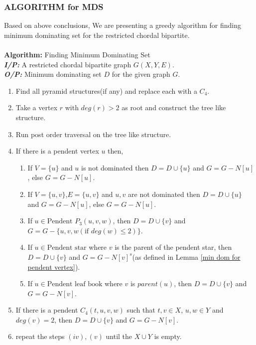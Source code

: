 \documentclass[11pt]{article}
\begin{document}
\subsubsection{ALGORITHM for MDS}
\begin{flushleft}
Based on above conclusions, We are presenting a greedy algorithm for finding minimum dominating set for the restricted chordal bipartite.\\
\hrulefill \\
\textbf{Algorithm:} Finding Minimum Dominating Set\\
\textbf{\textit{I/P:}} A restricted chordal bipartite graph $G(X,Y,E)$.\\
\textbf{\textit{O/P:}} Minimum dominating set $D$ for the given graph $G$.\\
\hrulefill

\begin{enumerate}[label=(\roman*)]
\item Find all pyramid structures(if any) and replace each with a $C_4$.
\item Take a vertex $r$ with $deg(r) > 2$ as root and construct the tree like structure.
\item Run post order traversal on the tree like structure.
\item If there is a pendent vertex $u$ then, 
\begin{enumerate}
	\item If $V= \{u\}$ and $u$ is not dominated then $D=D \cup \{ u \}$ and $G = G-N[u]$, else $G = G-N[u]$.
	\item If $V= \{u,v\}$,$E=\{u,v\}$ and $u,v$ are not dominated then $D=D \cup \{ u \}$ and $G = G-N[u]$, else $G = G-N[u]$.
	\item If $u \in \mbox{Pendent }P_3(u,v,w)$, then $D=D \cup \{ v \}$ and  $G = G - \{u,v,w(\mbox{if } deg(w) \leq 2) \}$.
	\item If $u \in \mbox{Pendent star}$ where $v$ is the parent of the pendent star, then $D=D \cup \{ v \}$ and $G = G -N[v]^s$(as defined in Lemma \ref{min dom for pendent vertex}).
	\item If $u \in \mbox{Pendent leaf book}$ where $v$ is $parent(u)$, then $D=D \cup \{ v \}$ and $G = G - N[v]$.
\end{enumerate}
\item If there is a pendent $C_4(t,u,v,w)$ such that $t,v \in X$, $u,w \in Y$ and $deg(v)=2$, then $D=D \cup \big \{ v \big \}$ and $G = G - N[v]$.
\item repeat the steps $(iv),(v)$ until the $X \cup Y$ is empty.
\end{enumerate}
\hrulefill
\end{flushleft}
%
%
\end{document}

